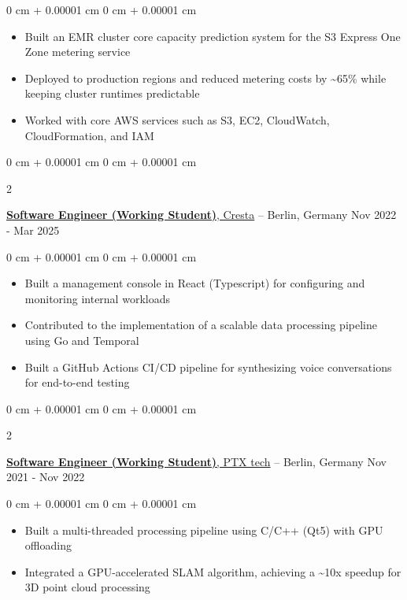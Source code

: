 \documentclass[10pt, letterpaper]{article}
\newenvironment{highlights}{
    \begin{itemize}[
        topsep=0.10 cm,
        parsep=0.10 cm,
        partopsep=0pt,
        itemsep=0pt,
        leftmargin=0 cm + 10pt
    ]
}{
    \end{itemize}
} %
\newenvironment{onecolentry}{
    \begin{adjustwidth}{
        0 cm + 0.00001 cm
    }{
        0 cm + 0.00001 cm
    }
}{
    \end{adjustwidth}
} %
\newenvironment{twocolentry}[2][]{
    \onecolentry
    \def\secondColumn{#2}
    \setcolumnwidth{\fill, 4.5 cm}
    \begin{paracol}{2}
}{
    \switchcolumn \raggedleft \secondColumn
    \end{paracol}
    \endonecolentry
} %
\begin{document}
        \vspace{0.10 cm}
        \begin{onecolentry}
            \begin{highlights}
                \item Built an EMR cluster core capacity prediction system for the S3 Express One Zone metering service
                \item Deployed to production regions and reduced metering costs by
                \textasciitilde65\% while keeping cluster runtimes predictable
                \item Worked with core AWS services such as S3, EC2, CloudWatch, CloudFormation, and IAM
            \end{highlights}
        \end{onecolentry}

        \vspace{0.2 cm}

        \begin{twocolentry}{
            Nov 2022 - Mar 2025
        }
            \href{https://www.cresta.com}{\textbf{Software Engineer (Working Student)}, Cresta} -- Berlin, Germany\end{twocolentry}

        \vspace{0.10 cm}
        \begin{onecolentry}
            \begin{highlights}
                \item Built a management console in React (Typescript) for configuring and monitoring internal workloads
                \item Contributed to the implementation of a scalable data processing pipeline using Go and Temporal
                \item Built a GitHub Actions CI/CD pipeline for synthesizing voice conversations for end-to-end testing
            \end{highlights}
        \end{onecolentry}

        \vspace{0.2 cm}
        \begin{twocolentry}{
            Nov 2021 - Nov 2022
        }
            \href{https://www.ptx-tech.de}{\textbf{Software Engineer (Working Student)}, PTX tech} -- Berlin, Germany\end{twocolentry}

        \vspace{0.10 cm}
        \begin{onecolentry}
            \begin{highlights}
                \item Built a multi-threaded processing pipeline using C/C++ (Qt5) with GPU offloading
                \item Integrated a GPU-accelerated SLAM algorithm, achieving a \textasciitilde10x speedup for 3D point cloud processing
            \end{highlights}
        \end{onecolentry}
\end{document}
